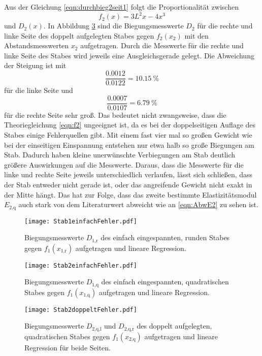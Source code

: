Aus der Gleichung \eqref{eqn:durchbieg2seit1} folgt die Proportionalität
zwischen
\begin{equation}
  f_2(x) = 3L^2x - 4x^3
  \label{eqn:f2}
\end{equation}
und $D_2(x)$. In Abbildung \ref{fig:Stab2doppeltFehler} sind die
Biegungsmesswerte $D_2$ für die rechte und linke Seite des doppelt
aufgelegten Stabes gegen $f_2(x_2)$ mit den Abstandsmesswerten $x_2$
aufgetragen. Durch die Messwerte für die rechte und linke Seite des Stabes
wird jeweils eine Ausgleichsgerade gelegt.
Die Abweichung der Steigung ist mit
\begin{equation}
  \frac{0.0012}{0.0122} = \SI{10.15}{\percent}
\end{equation}
für die linke Seite und
\begin{equation}
  \frac{0.0007}{0.0107} = \SI{6.79}{\percent}
\end{equation}
für die rechte Seite sehr groß.
Das bedeutet nicht zwangsweise, dass die Theoriegleichung \eqref{eqn:f2}
ungeeignet ist, da es bei der doppelseitigen Auflage des Stabes einige
Fehlerquellen gibt. Mit einem fast vier mal so großen Gewicht wie bei
der einseitigen Einspannung entstehen nur etwa halb so große Biegungen
am Stab. Dadurch haben kleine unerwünschte Verbiegungen am Stab deutlich größere
Auswirkungen auf die Messwerte. Daraus, dass die Messwerte für die linke und
rechte Seite jeweils unterschiedlich verlaufen, lässt sich schließen, dass
der Stab entweder nicht gerade ist, oder das angreifende Gewicht nicht exakt
in der Mitte hängt. Das hat zur Folge, dass das zweite bestimmte
Elastizitätsmodul $E_\text{2,q}$ auch stark von dem Literaturwert abweicht wie
an \eqref{eqn:AbwE2} zu sehen ist.

\begin{figure}
  \centering
  \texttt{[image: Stab1einfachFehler.pdf]}
  \caption{Biegungsmesswerte $D_\text{1,r}$ des einfach eingespannten, runden
  Stabes gegen $f_1(x_\text{1,r})$ aufgetragen und lineare Regression.}
  \label{fig:Stab1einfachFehler}
\end{figure}

\begin{figure}
  \centering
  \texttt{[image: Stab2einfachFehler.pdf]}
  \caption{Biegungsmesswerte $D_\text{1,q}$ des einfach eingespannten,
  quadratischen
  Stabes gegen $f_1(x_\text{1,q})$ aufgetragen und lineare Regression.}
  \label{fig:Stab2einfachFehler}
\end{figure}

\begin{figure}
  \centering
  \texttt{[image: Stab2doppeltFehler.pdf]}
  \caption{Biegungsmesswerte $D_\text{2,q,l}$ und $D_\text{2,q,r}$ des doppelt
  aufgelegten, quadratischen Stabes gegen $f_1(x_\text{2,q})$ aufgetragen und
  lineare Regression für beide Seiten.}
  \label{fig:Stab2doppeltFehler}
\end{figure}
